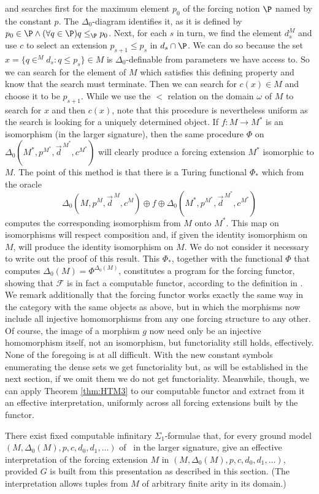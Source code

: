 \documentclass{amsart}
\begin{document}
and searches first for the maximum element $p_0$ of the forcing notion $\P$
named by the constant $p$.
The $\Delta_0$-diagram identifies it, as it is defined by
$p_0\in\P \land (\forall q\in\P) q\leq_{\P}p_0$.
Next, for each $s$ in turn, we find the
element $d_s^M$ and use $c$ to select an extension $p_{s+1}\leq p_s$
in $d_s\cap\P$. We can do so because the set $x = \{ q \in^M d_s : q \le p_s \} \in M$ is $\Delta_0$-definable from parameters we have access to. So we can search for the element of $M$ which satisfies this defining property and know that the search must terminate. Then we can search for $c(x) \in M$ and choose it to be $p_{s+1}$.
While we use the $<$ relation on the domain $\omega$ of $M$ to search for $x$ and then $c(x)$, note that this procedure is nevertheless uniform as the search is looking for a uniquely determined object.
If $f:M \to M^*$ is an isomorphism (in the larger signature),
then the same procedure $\Phi$ on $\Delta_0(M^*,p^{M^*},\vec{d}^{\,M^*},c^{M^*})$
will clearly produce a forcing extension $M^*$ isomorphic to $M$.
The point of this method is that there is a Turing functional $\Phi_*$ which
from the oracle
$$\Delta_0(M,p^M,\vec{d}^{\,M},c^M)\oplus f \oplus \Delta_0(M^*,p^{M^*},\vec{d}^{\,M^*},c^{M^*})$$
computes the corresponding isomorphism from $M$ onto $M^*$.
This map on isomorphisms will respect composition and, if given the identity
isomorphism on $M$, will produce the identity isomorphism on $M$.
We do not consider it necessary to write out the proof of this result.
This $\Phi_*$, together with the functional $\Phi$ that computes $\Delta_0(M) = \Phi^{\Delta_0(M)}$,
constitutes a program for the forcing functor, showing that
$\mathcal{F}$ is in fact a computable functor, according to the definition in \cite{MPSS}.
We remark additionally that the forcing functor works exactly the same way
in the category with the same objects as above, but in which the morphisms now include
all injective homomorphisms from any one forcing structure to any other.
Of course, the image of a morphism $g$ now need only be an injective homomorphism itself,
not an isomorphism, but functoriality still holds, effectively.
None of the foregoing is at all difficult. With the new constant symbols enumerating the dense sets we get functoriality but, as will be established in the next section, if we omit them we do not get functoriality.
Meanwhile, though, we can apply Theorem \ref{thm:HTM3} to our computable functor and extract
from it an effective interpretation, uniformly across all forcing extensions built by the functor.
\begin{corollary}
\label{cor:interpretations}
There exist fixed computable infinitary $\Sigma_1$-formulae that,
for every ground model
$(M, \Delta_0(M),p,c,d_0,d_1,\ldots)$ of \ZFC\ in the larger signature,
give an effective interpretation of the forcing extension $M$
in $(M, \Delta_0(M),p,c,d_0,d_1,\ldots)$, provided
$G$ is built from this presentation as described in this section.
(The interpretation allows tuples from $M$ of arbitrary finite arity in its domain.)
\end{corollary}
\end{document}
